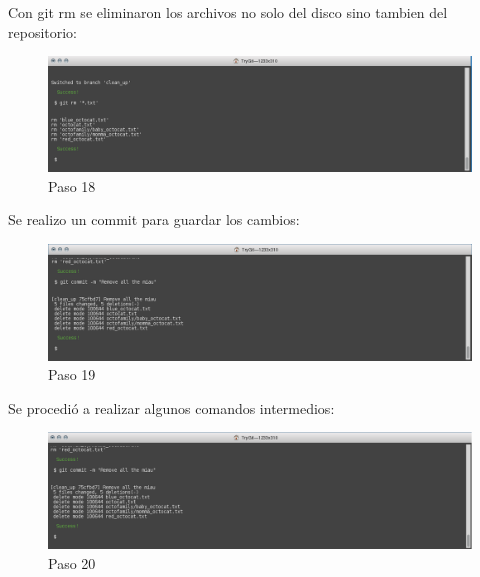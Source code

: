 \documentclass[11pt]{article}
\begin{document}
Con git rm se eliminaron los archivos no solo del disco sino tambien del repositorio:

\begin{figure}[H]
\centering
\includegraphics[scale=0.8]{img/18.png}
\caption{Paso 18}
\label{fig:18}
\end{figure}

Se realizo un commit para guardar los cambios:

\begin{figure}[H]
\centering
\includegraphics[scale=0.8]{img/19.png}
\caption{Paso 19}
\label{fig:19}
\end{figure}

Se procedió a realizar algunos comandos intermedios:

\begin{figure}[H]
\centering
\includegraphics[scale=0.8]{img/20.png}
\caption{Paso 20}
\label{fig:20}
\end{figure}
\end{document}
